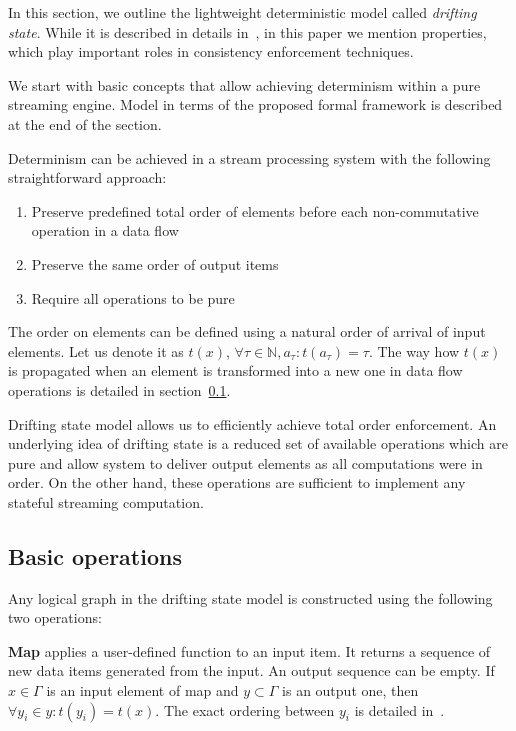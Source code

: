 
\label {fs-model-section}

In this section, we outline the lightweight deterministic model called {\em drifting state}. While it is described in details in~\cite{we2018adbis}, in this paper we mention properties, which play important roles in consistency enforcement techniques.

We start with basic concepts that allow achieving determinism within a pure streaming engine. Model in terms of the proposed formal framework is described at the end of the section.

Determinism can be achieved in a stream processing system with the following straightforward approach:
\begin{enumerate}
    \item Preserve predefined total order of elements before each non-commutative operation in a data flow
    \item Preserve the same order of output items
    \item Require all operations to be pure
\end{enumerate}

The order on elements can be defined using a natural order of   arrival of input elements. Let us denote it as $t(x)$, $\forall \tau \in \mathbb{N}, a_\tau :  t(a_\tau)=\tau$. The way how $t(x)$ is propagated when an element is transformed into a new one in data flow operations is detailed in section~\ref{ops}.

Drifting state model allows us to efficiently achieve total order enforcement. An underlying idea of drifting state is a reduced set of available operations which are pure and allow system to deliver output elements as all computations were in order. On the other hand, these operations are sufficient to implement any stateful streaming computation.

\subsection{Basic operations}
\label{ops}

Any logical graph in the drifting state model is constructed using the following two operations:

{\bf Map} applies a user-defined function to an input item. It returns a sequence of new data items generated from the input. An output sequence can be empty. If $x\in \Gamma$ is an input element of map and $y\subset \Gamma$ is an output one, then $\forall y_i \in y : t(y_i)=t(x)$. The exact ordering between $y_i$ is detailed in~\cite{we2018adbis}.

